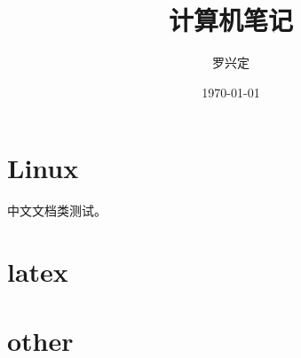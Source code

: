 \documentclass[fontset=none,UTF8]{ctexart}
\title{计算机笔记}
\author{罗兴定}
\date{\today}
\begin{document}
\maketitle
\tableofcontents

\part{Linux}
	
	  中文文档类测试。
\part{latex}
	
\part{other}
\end{document}
